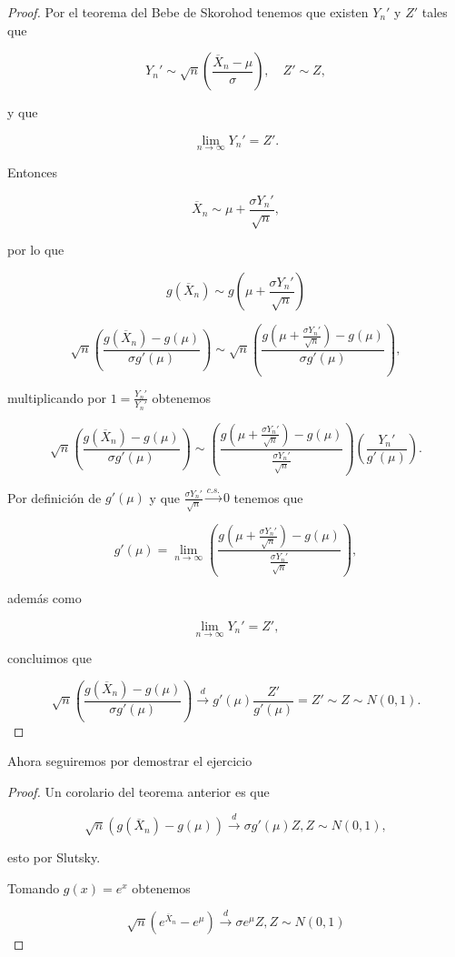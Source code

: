 \documentclass[letterpaper]{article}
\theoremstyle{definition}
\theoremstyle{lemathm}
\theoremstyle{lemathm}
\theoremstyle{lemademthm}
\newcommand{\limninf}{\lim_{n\to\infty}}
\newcommand{\pars}[1]{\left( #1 \right) }
\newcommand{\1}{\mathbbm{1}}
\begin{document}
\begin{enumerate}
\begin{proof}
			Por el teorema del Bebe de Skorohod tenemos que existen $Y_n'$ y $Z'$ tales que

			\[Y_n' \sim \sqrt{n} \pars{\frac{\overline{X}_n - \mu}{\sigma}}, \quad Z' \sim Z,\]

			y que

			\[\limninf Y_n' = Z'.\]
			
			Entonces

			\[\overline{X}_n \sim \mu + \frac{\sigma Y_n'}{\sqrt{n}},\]

			por lo que

			\[g\pars{\overline{X}_n} \sim g\pars{\mu + \frac{\sigma Y_n'}{\sqrt{n}}}\]

			\[\sqrt{n} \pars{\frac{g\pars{\overline{X}_n} - g\pars{\mu}}{\sigma g'(\mu)}} \sim \sqrt{n} \pars{\frac{g\pars{\mu + \frac{\sigma Y_n'}{\sqrt{n}}} - g\pars{\mu}}{\sigma g'(\mu)}},\]

			multiplicando por $1 = \frac{Y_n'}{Y_n'}$ obtenemos

			\[\sqrt{n} \pars{\frac{g\pars{\overline{X}_n} - g\pars{\mu}}{\sigma g'(\mu)}} \sim \pars{\frac{g\pars{\mu + \frac{\sigma Y_n'}{\sqrt{n}}} - g\pars{\mu}}{\frac{\sigma Y_n'}{\sqrt{n}}}} \pars{\frac{Y_n'}{g'(\mu)}}.\]

			Por definición de $g'(\mu)$ y que $\frac{\sigma Y_n'}{\sqrt{n}} \xrightarrow{c.s.} 0$ tenemos que

			\[g'(\mu) = \limninf \pars{\frac{g\pars{\mu + \frac{\sigma Y_n'}{\sqrt{n}}} - g\pars{\mu}}{\frac{\sigma Y_n'}{\sqrt{n}}}},\]

			además como

			\[\limninf Y_n' = Z',\]

			concluimos que

			\[\sqrt{n} \pars{\frac{g\pars{\overline{X}_n} - g\pars{\mu}}{\sigma g'(\mu)}} \xrightarrow{d} g'(\mu)\frac{Z'}{g'(\mu)} = Z' \sim Z \sim N(0,1).\]

		\end{proof}

		Ahora seguiremos por demostrar el ejercicio

		\begin{proof}
			Un corolario del teorema anterior es que

			\[\sqrt{n} \pars{g\pars{\overline{X}_n} - g\pars{\mu}} \xrightarrow{d} \sigma g'(\mu) Z, Z \sim N(0,1),\]

			esto por Slutsky.

			Tomando $g(x) = e^x$ obtenemos

			\[\sqrt{n} \pars{e^{\overline{X}_n} - e^{\mu}} \xrightarrow{d} \sigma e^\mu Z, Z \sim N(0,1)\]
		\end{proof}


\end{enumerate}
\end{document}
